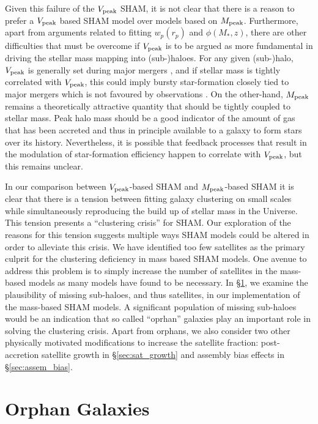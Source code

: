 \documentclass[a4paper,fleqn,usenatbib]{mnras}
\begin{document}
Given this failure of the $V_{\rm peak}$ SHAM, it is not clear that there is a reason to prefer a $V_{\rm peak}$ based SHAM model over models based on $M_{\rm peak}$.  Furthermore, apart from arguments related to fitting $w_p(r_p)$ and $\phi(M_*,z)$, there are other difficulties that must be overcome if $V_{\rm peak}$ is to be argued as more fundamental in driving the stellar mass mapping into (sub-)haloes.  For any given (sub-)halo, $V_{\rm peak}$ is generally set during major mergers \citep[1:5 or larger, ][]{Behroozi:2014bg}, and if stellar mass is tightly correlated with $V_{\rm peak}$, this could imply bursty star-formation closely tied to major mergers which is not favoured by observations \citep[e.g. star formation histories,][]{Diemer:2017gj}.  On the other-hand, $M_{\rm peak}$ remains a theoretically attractive quantity that should be tightly coupled to stellar mass.  Peak halo mass should be a good indicator of the amount of gas that has been accreted and thus in principle available to a galaxy to form stars over its history.  Nevertheless, it is possible that feedback processes that result in the modulation of star-formation efficiency happen to correlate with $V_{\rm peak}$, but this remains unclear.  

In our comparison between $V_{\rm peak}$-based SHAM and $M_{\rm peak}$-based SHAM it is clear that there is a tension between fitting galaxy clustering on small scales while simultaneously reproducing the build up of stellar mass in the Universe.  This tension presents a ``clustering crisis'' for SHAM.  Our exploration of the reasons for this tension suggests multiple ways SHAM models could be altered in order to alleviate this crisis.  We have identified too few satellites as the primary culprit for the clustering deficiency in mass based SHAM models.  One avenue to address this problem is to simply increase the number of satellites in the mass-based models as many models have found to be necessary.  In \S \ref{sec:orphans}, we examine the plausibility of missing sub-haloes, and thus satellites, in our implementation of the mass-based SHAM models.  A significant population of missing sub-haloes would be an indication that so called ``oprhan'' galaxies play an important role in solving the clustering crisis.  Apart from orphans, we also consider two other physically motivated modifications to increase the satellite fraction: post-accretion satellite growth in \S \ref{sec:sat_growth} and assembly bias effects in \S \ref{sec:assem_bias}.   


\section{Orphan Galaxies}
\label{sec:orphans}
\end{document}
